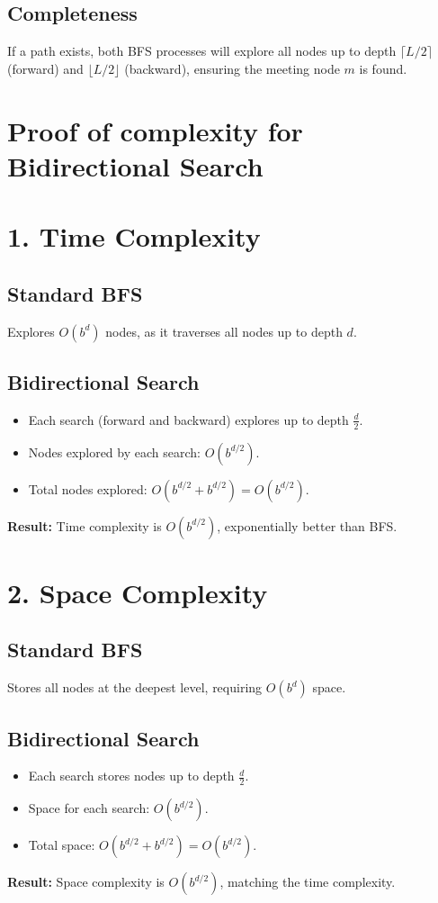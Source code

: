 \begin{appendices}
\subsection*{Completeness}
If a path exists, both BFS processes will explore all nodes up to depth $\lceil L/2 \rceil$ (forward) and $\lfloor L/2 \rfloor$ (backward), ensuring the meeting node $m$ is found.

\section{Proof of complexity for Bidirectional Search}\label{appendix:bidirectional:complexity}
\section*{1. Time Complexity}
\subsection*{Standard BFS}
Explores $O(b^d)$ nodes, as it traverses all nodes up to depth $d$.

\subsection*{Bidirectional Search}
\begin{itemize}
	\item Each search (forward and backward) explores up to depth $\frac{d}{2}$.
	\item Nodes explored by each search: $O(b^{d/2})$.
	\item Total nodes explored: $O(b^{d/2} + b^{d/2}) = O(b^{d/2})$.
\end{itemize}
\textbf{Result:} Time complexity is $O(b^{d/2})$, exponentially better than BFS.

\section*{2. Space Complexity}
\subsection*{Standard BFS}
Stores all nodes at the deepest level, requiring $O(b^d)$ space.

\subsection*{Bidirectional Search}
\begin{itemize}
	\item Each search stores nodes up to depth $\frac{d}{2}$.
	\item Space for each search: $O(b^{d/2})$.
	\item Total space: $O(b^{d/2} + b^{d/2}) = O(b^{d/2})$.
\end{itemize}
\textbf{Result:} Space complexity is $O(b^{d/2})$, matching the time complexity.


\end{appendices}
